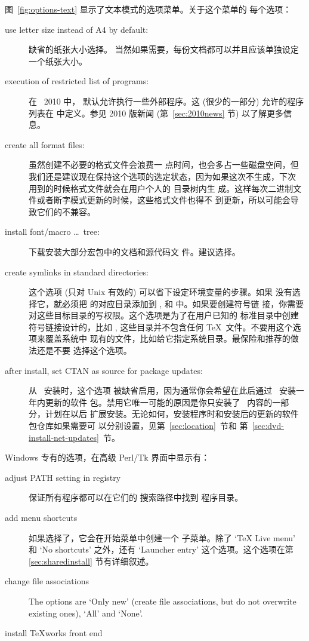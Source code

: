 \documentclass{article}
\begin{document}
图~\ref{fig:options-text} 显示了文本模式的选项菜单。关于这个菜单的
每个选项：

\begin{description}
\item[use letter size instead of A4 by default:] 缺省的纸张大小选择。
当然如果需要，每份文档都可以并且应该单独设定一个纸张大小。

\item[execution of restricted list of programs:] 在 \TL\ 2010 中，
默认允许执行一些外部程序。这 (很少的一部分) 允许的程序列表在
 中定义。参见 2010 版新闻 (第~\ref{sec:2010news} 节)
以了解更多信息。

\item[create all format files:] 虽然创建不必要的格式文件会浪费一
点时间，也会多占一些磁盘空间，但
我们还是建议现在保持这个选项的选定状态，因为如果这次不生成，下次
用到的时候格式文件就会在用户个人的  目录树内生
成。这样每次二进制文件或者断字模式更新的时候，这些格式文件也得不
到更新，所以可能会导致它们的不兼容。

\item[install font/macro \ldots\ tree:] 下载安装大部分宏包中的文档和源代码文
件。建议选择。

\item[create symlinks in standard directories:]
这个选项 (只对 Unix 有效的) 可以省下设定环境变量的步骤。如果
没有选择它，就必须把 \TL{} 的对应目录添加到 ,
 和  中。如果要创建符号链
接，你需要对这些目标目录的写权限。这个选项是为了在用户已知的
标准目录中创建符号链接设计的，比如 ,
这些目录并不包含任何 \TeX\ 文件。不要用这个选项来覆盖系统中
现有的文件，比如给它指定系统目录。最保险和推荐的做法还是不要
选择这个选项。

\item[after install, set CTAN as source for package updates:]
从 \DVD\ 安装时，这个选项
被缺省启用，因为通常你会希望在此后通过 \CTAN\ 安装一年内更新的软件
包。禁用它唯一可能的原因是你只安装了 \DVD\ 内容的一部分，计划在以后
扩展安装。无论如何，安装程序时和安装后的更新的软件包仓库如果需要可
以分别设置，见第~\ref{sec:location}~节和
第~\ref{sec:dvd-install-net-updates}~节。
\end{description}

Windows 专有的选项，在高级 Perl/Tk 界面中显示有：
\begin{description}
\item[adjust PATH setting in registry] 保证所有程序都可以在它们的
搜索路径中找到 \TL{} 程序目录。

\item[add menu shortcuts] 如果选择了，它会在开始菜单中创建一个 \TL{}
子菜单。除了 `TeX Live menu' 和 `No shortcuts' 之外，还有 `Launcher entry'
这个选项。这个选项在第 \ref{sec:sharedinstall} 节有详细叙述。

\item[change file associations] The options are `Only new' (create
  file associations, but do not overwrite existing ones), `All' and
  `None'.

\item[install \TeX{}works front end]
\end{description}
\end{document}
